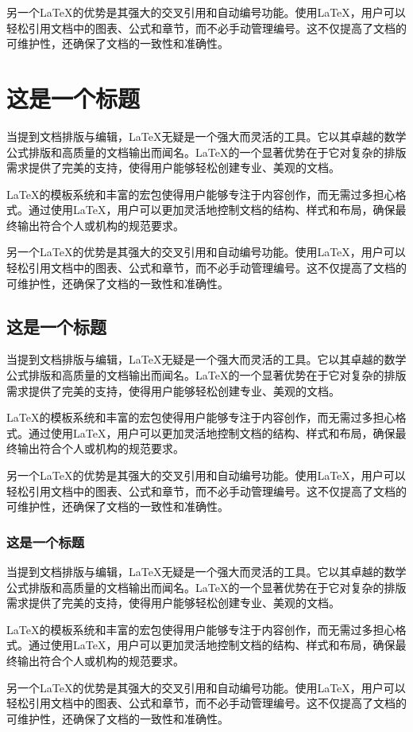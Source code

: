 \documentclass[AutoFakeBold,a4paper]{ctexart}
\begin{document}
另一个LaTeX的优势是其强大的交叉引用和自动编号功能。使用LaTeX，用户可以轻松引用文档中的图表、公式和章节，而不必手动管理编号。这不仅提高了文档的可维护性，还确保了文档的一致性和准确性。

\section{这是一个标题}

当提到文档排版与编辑，LaTeX无疑是一个强大而灵活的工具。它以其卓越的数学公式排版和高质量的文档输出而闻名。LaTeX的一个显著优势在于它对复杂的排版需求提供了完美的支持，使得用户能够轻松创建专业、美观的文档。

LaTeX的模板系统和丰富的宏包使得用户能够专注于内容创作，而无需过多担心格式。通过使用LaTeX，用户可以更加灵活地控制文档的结构、样式和布局，确保最终输出符合个人或机构的规范要求。

另一个LaTeX的优势是其强大的交叉引用和自动编号功能。使用LaTeX，用户可以轻松引用文档中的图表、公式和章节，而不必手动管理编号。这不仅提高了文档的可维护性，还确保了文档的一致性和准确性。

\subsection{这是一个标题}

当提到文档排版与编辑，LaTeX无疑是一个强大而灵活的工具。它以其卓越的数学公式排版和高质量的文档输出而闻名。LaTeX的一个显著优势在于它对复杂的排版需求提供了完美的支持，使得用户能够轻松创建专业、美观的文档。

LaTeX的模板系统和丰富的宏包使得用户能够专注于内容创作，而无需过多担心格式。通过使用LaTeX，用户可以更加灵活地控制文档的结构、样式和布局，确保最终输出符合个人或机构的规范要求。

另一个LaTeX的优势是其强大的交叉引用和自动编号功能。使用LaTeX，用户可以轻松引用文档中的图表、公式和章节，而不必手动管理编号。这不仅提高了文档的可维护性，还确保了文档的一致性和准确性。

\subsubsection{这是一个标题}

当提到文档排版与编辑，LaTeX无疑是一个强大而灵活的工具。它以其卓越的数学公式排版和高质量的文档输出而闻名。LaTeX的一个显著优势在于它对复杂的排版需求提供了完美的支持，使得用户能够轻松创建专业、美观的文档。

LaTeX的模板系统和丰富的宏包使得用户能够专注于内容创作，而无需过多担心格式。通过使用LaTeX，用户可以更加灵活地控制文档的结构、样式和布局，确保最终输出符合个人或机构的规范要求。

另一个LaTeX的优势是其强大的交叉引用和自动编号功能。使用LaTeX，用户可以轻松引用文档中的图表、公式和章节，而不必手动管理编号。这不仅提高了文档的可维护性，还确保了文档的一致性和准确性。
\end{document}
